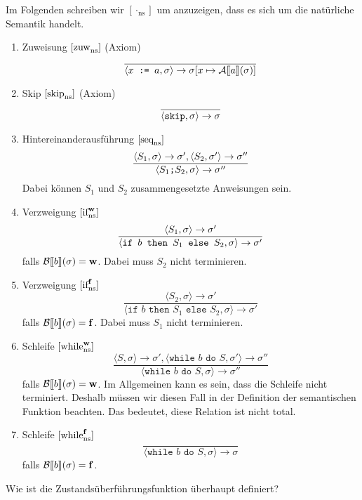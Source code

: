 Im Folgenden schreiben wir $[\cdot_{\text{ns}}]$ um anzuzeigen, dass es sich um die natürliche Semantik handelt.

\begin{enumerate}
    \item Zuweisung $\infruleNs{zuw}$ (Axiom)
    \[
    \frac{}{\strans{x \texttt{ := } a}{\sigma}{\sigma[x \mapsto \Asem{a}(\sigma)]}}
    \]

    \item Skip $\infruleNs{skip}$ (Axiom)
    \[
    \frac{}{\strans{\texttt{skip}}{\sigma}{\sigma}}
    \]

    \item Hintereinanderausführung $\infruleNs{seq}$
    \[
    \frac{\strans{S_1}{\sigma}{\sigma'}, \strans{S_2}{\sigma'}{\sigma''}}{\strans{S_1 \texttt{;} S_2}{\sigma}{\sigma''}}
    \]
    Dabei können $S_1$ und $S_2$ zusammengesetzte Anweisungen sein.

    \item Verzweigung $\infruleNs[\true]{if}$
    \[
    \frac{\strans{S_1}{\sigma}{\sigma'}}{\strans{\texttt{if } b \texttt{ then } S_1 \texttt{ else } S_2}{\sigma}{\sigma'}}
    \]
    falls $\Bsem{b}(\sigma) = \true$. Dabei muss $S_2$ nicht terminieren.

    \item Verzweigung $\infruleNs[\false]{if}$
    \[
    \frac{\langle S_2, \sigma \rangle \to \sigma'}{\langle \texttt{if } b \texttt{ then } S_1 \texttt{ else } S_2, \sigma \rangle \to \sigma'}
    \]
    falls $\Bsem{b}(\sigma) = \false$. Dabei muss $S_1$ nicht terminieren.

    \item Schleife $\infruleNs[\true]{while}$
    \[
    \frac{\langle S, \sigma \rangle \to \sigma', \langle \texttt{while } b \texttt{ do } S, \sigma' \rangle \to \sigma''}{\langle \texttt{while } b \texttt{ do } S, \sigma \rangle \to \sigma''}
    \]
    falls $\Bsem{b}(\sigma) = \true$. Im Allgemeinen kann es sein, dass die Schleife nicht terminiert. Deshalb müssen wir diesen Fall in der Definition der semantischen Funktion beachten. Das bedeutet, diese Relation ist nicht total.

    \item Schleife $\infruleNs[\false]{while}$
    \[
    \frac{\text{ }}{\langle \texttt{while } b \texttt{ do } S, \sigma \rangle \to \sigma}
    \]
    falls $\Bsem{b}(\sigma) = \false$.
\end{enumerate}

\par\bigskip
\par\bigskip
Wie ist die Zustandsüberführungsfunktion überhaupt definiert?

